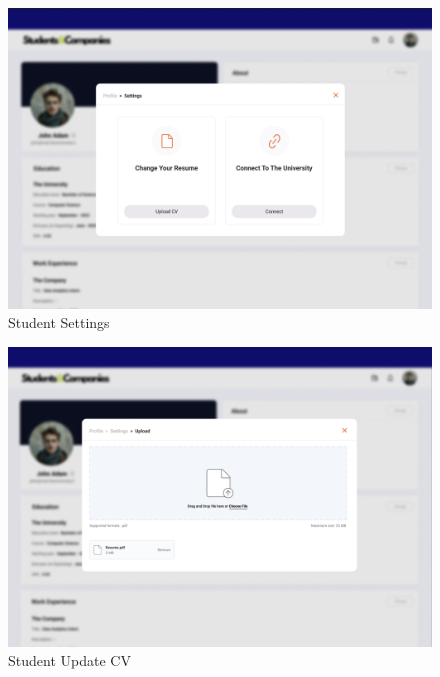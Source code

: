 \documentclass[a4paper,12pt]{article}
\begin{document}
\begin{figure}[H]
    \centering
    \includegraphics[scale = 0.42]{figures/UserInterfaces/Student/Settings.png}
    \caption{Student Settings}
     \centering
\end{figure}
\begin{figure}[H]
    \centering
    \includegraphics[scale = 0.42]{figures/UserInterfaces/Student/UploadCv.png}
    \caption{Student Update CV}
     \centering
\end{figure}
\end{document}
